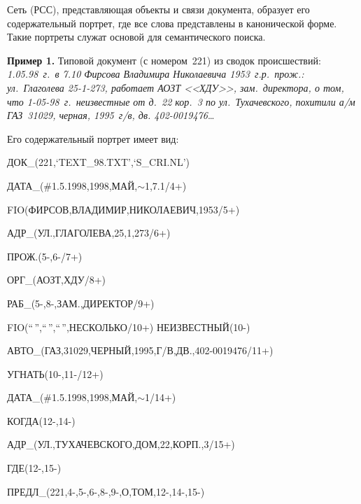 \begin{multicols}{2}
\vspace*{-3pt}
    
    Сеть (РСС), представляющая объекты и связи документа, образует его 
содержательный портрет, где все слова представлены в канонической форме. 
Такие портреты служат основой для семантического поиска.
    
    \smallskip
    
    \noindent
    \textbf{Пример 1.} Типовой документ (с номером~221) из сводок 
происшествий:
    \textit{1.05.98~г.\ в 7.10 Фирсова Владимира Николаевича 1953~г.р.\ прож.: 
ул.~Глаголева 25-1-273, работает АОЗТ <<ХДУ>>, зам.\ директора, о том, 
что 1-05-98~г.\ неизвестные от д.~22 кор.~3 по ул.~Тухачевского, похитили а/м 
ГАЗ~31029, черная, 1995~г/в, дв. 402-0019476}\ldots
    
    Его содержательный портрет имеет вид:
    
\smallskip

{\footnotesize

\noindent    
     ДОК\_(221,`TEXT\_98.TXT',`S\_CRI.NL')

\noindent     
     ДАТА\_(\#1.5.1998,1998,МАЙ,$\sim$1,7.1/4+)

\noindent     
     FIO(ФИРСОВ,ВЛАДИМИР,НИКОЛАЕВИЧ,1953/5+)
     
\noindent     
 АДР\_(УЛ.,ГЛАГОЛЕВА,25,1,273/6+)
     
\noindent     
     ПРОЖ.(5-,6-/7+)
     
\noindent     
     ОРГ\_(АОЗТ,ХДУ/8+)
     
\noindent     
     РАБ\_(5-,8-,ЗАМ.,ДИРЕКТОР/9+)
     
\noindent     
     FIO(``\,'',``\,'',``\,'',НЕСКОЛЬКО/10+) \mbox{НЕИЗВЕСТНЫЙ(10-)}
     
\noindent     
     АВТО\_(ГАЗ,31029,ЧЕРНЫЙ,1995,Г/В,ДВ.,402-0019476/11+)
     

\noindent     
    УГНАТЬ(10-,11-/12+)
     
\noindent     
     ДАТА\_(\#1.5.1998,1998,МАЙ,$\sim$1/14+)
     
\noindent     
     КОГДА(12-,14-)
     
\noindent     
     АДР\_(УЛ.,ТУХАЧЕВСКОГО,ДОМ,22,КОРП.,3/15+)
     
\noindent     
     ГДЕ(12-,15-)
     
\noindent     
     ПРЕДЛ\_(221,4-,5-,6-,8-,9-,О,ТОМ,12-,14-,15-)
     }
     
     \smallskip
    

\end{multicols}
